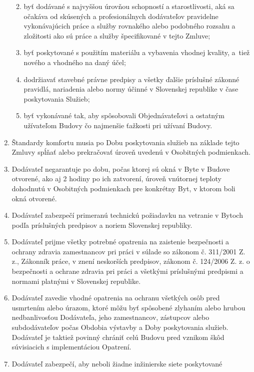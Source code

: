 \begin{multicols}{2}
\begin{enumerate}
  \begin{enumerate}
  \def\labelenumii{\arabic{enumii}.}
  \item
    byť dodávané s najvyššou úrovňou schopností a starostlivosti, aká sa
    očakáva od skúsených a profesionálnych dodávateľov pravidelne
    vykonávajúcich práce a služby rovnakého alebo podobného rozsahu a
    zložitosti ako sú práce a služby špecifikované v tejto Zmluve;
  \item
    byť poskytované s použitím materiálu a vybavenia vhodnej kvality,
    a~tiež nového a vhodného na daný účel;
  \item
    dodržiavať stavebné právne predpisy a všetky ďalšie príslušné
    zákonné pravidlá, nariadenia alebo normy účinné v Slovenskej
    republike v čase poskytovania Služieb;
  \item
    byť vykonávané tak, aby spôsobovali Objednávateľovi a ostatným
    užívateľom Budovy čo najmenšie ťažkosti pri užívaní Budovy.
  \end{enumerate}
\item
  Štandardy komfortu musia po Dobu poskytovania služieb na základe tejto
  Zmluvy spĺňať alebo prekračovať úroveň uvedenú v Osobitných
  podmienkach.
\item
  Dodávateľ negarantuje po dobu, počas ktorej sú okná v Byte v Budove
  otvorené, ako aj 2 hodiny po ich zatvorení, úroveň vnútornej teploty
  dohodnutú v Osobitných podmienkach pre konkrétny Byt, v ktorom boli
  okná otvorené.
\item
  Dodávateľ zabezpečí primeranú technickú požiadavku na vetranie v
  Bytoch podľa príslušných predpisov a noriem Slovenskej republiky.
\item
  Dodávateľ prijme všetky potrebné opatrenia na zaistenie bezpečnosti a
  ochrany zdravia zamestnancov pri práci v súlade so zákonom č. 311/2001
  Z. z., Zákonník práce, v znení neskorších predpisov, zákonom č.
  124/2006 Z. z. o bezpečnosti a ochrane zdravia pri práci a všetkými
  príslušnými predpismi a normami platnými v Slovenskej republike.
\item
  Dodávateľ zavedie vhodné opatrenia na ochranu všetkých osôb pred
  usmrtením alebo úrazom, ktoré môžu byť spôsobené zlyhaním alebo hrubou
  nedbanlivosťou Dodávateľa, jeho zamestnancov, zástupcov alebo
  subdodávateľov počas Obdobia výstavby a Doby poskytovania služieb.
  Dodávateľ je taktiež povinný chrániť celú Budovu pred vznikom škôd
  súvisiacich s implementáciou Opatrení.
\item
  Dodávateľ zabezpečí, aby neboli žiadne inžinierske siete poskytované

\end{enumerate}
\end{multicols}
